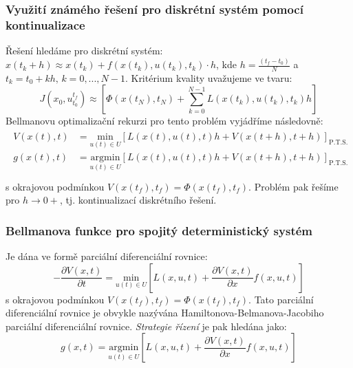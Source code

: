 \subsubsection*{Využití známého řešení pro diskrétní systém pomocí kontinualizace}
Řešení hledáme pro diskrétní systém: $ x(t_k + h) \approx x(t_k) + f(x(t_k), u(t_k), t_k) \cdot h $, kde $ h = \frac{(t_f - t_0)}{N} $ a $ t_k = t_0 + kh, \, k=0,...,N-1 $. Kritérium kvality uvažujeme ve tvaru:
\begin{equation}
J(x_0, u_{t_0}^{t_f}) \approx \left[ \Phi(x(t_N), t_N) + \displaystyle{\sum_{k=0}^{N-1} L(x(t_k), u(t_k), t_k) h} \right]
\end{equation}
Bellmanovu optimalizační rekurzi pro tento problém vyjádříme následovně:
\begin{align*}
\begin{split}
V(x(t), t) &= \underset{u(t) \in U}{\mathrm{min}} \left[ L(x(t), u(t), t) h + V(x(t+h), t+h) \right]_{\mathrm{P.T.S.}} \\
g(x(t), t) &= \underset{u(t) \in U}{\mathrm{argmin}} \left[ L(x(t), u(t), t) h + V(x(t+h), t+h) \right]_{\mathrm{P.T.S.}} \\
\end{split}
\end{align*}
s okrajovou podmínkou $ V(x(t_f), t_f) = \Phi(x(t_f), t_f) $. Problém pak řešíme pro $ h \to 0+ $, tj. kontinualizací diskrétního řešení.

\subsubsection*{Bellmanova funkce pro spojitý deterministický systém}
Je dána ve formě parciální diferenciální rovnice:
\begin{equation}
- \frac{\partial V(x,t)}{\partial t} = \underset{u(t) \in U}{\mathrm{min}} \left[ L(x, u, t) + \frac{\partial V(x,t)}{\partial x} f(x,u,t) \right]
\end{equation}
s okrajovou podmínkou $ V(x(t_f), t_f) = \Phi(x(t_f), t_f) $. Tato parciální diferenciální rovnice je obvykle nazývána Hamiltonova-Belmanova-Jacobiho parciální
diferenciální rovnice. \textit{Strategie řízení} je pak hledána jako:
\begin{equation}
g(x,t) = \underset{u(t) \in U}{\mathrm{argmin}} \left[ L(x, u, t) + \frac{\partial V(x,t)}{\partial x} f(x,u,t) \right]
\end{equation}


